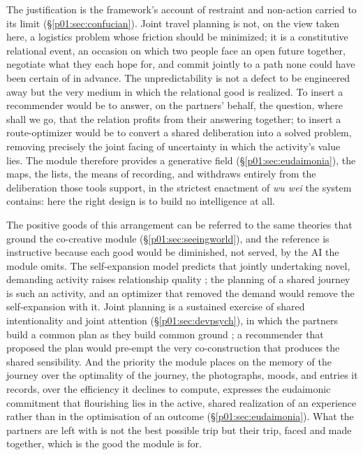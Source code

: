 \documentclass[11pt,a4paper]{article}
\begin{document}
The justification is the framework's account of restraint and non-action carried to its limit (§\ref{p01:sec:confucian}). Joint travel planning is not, on the view taken here, a logistics problem whose friction should be minimized; it is a constitutive relational event, an occasion on which two people face an open future together, negotiate what they each hope for, and commit jointly to a path none could have been certain of in advance. The unpredictability is not a defect to be engineered away but the very medium in which the relational good is realized. To insert a recommender would be to answer, on the partners' behalf, the question, where shall we go, that the relation profits from their answering together; to insert a route-optimizer would be to convert a shared deliberation into a solved problem, removing precisely the joint facing of uncertainty in which the activity's value lies. The module therefore provides a generative field (§\ref{p01:sec:eudaimonia}), the maps, the lists, the means of recording, and withdraws entirely from the deliberation those tools support, in the strictest enactment of \emph{wu wei} the system contains: here the right design is to build no intelligence at all.

The positive goods of this arrangement can be referred to the same theories that ground the co-creative module (§\ref{p01:sec:seeingworld}), and the reference is instructive because each good would be diminished, not served, by the AI the module omits. The self-expansion model predicts that jointly undertaking novel, demanding activity raises relationship quality \parencite{aron1986love, aron2000couples}; the planning of a shared journey is such an activity, and an optimizer that removed the demand would remove the self-expansion with it. Joint planning is a sustained exercise of shared intentionality and joint attention (§\ref{p01:sec:devpsych}), in which the partners build a common plan as they build common ground \parencite{tomasello2005intentions, clark1996using}; a recommender that proposed the plan would pre-empt the very co-construction that produces the shared sensibility. And the priority the module places on the memory of the journey over the optimality of the journey, the photographs, moods, and entries it records, over the efficiency it declines to compute, expresses the eudaimonic commitment that flourishing lies in the active, shared realization of an experience rather than in the optimisation of an outcome (§\ref{p01:sec:eudaimonia}). What the partners are left with is not the best possible trip but their trip, faced and made together, which is the good the module is for.
\end{document}
